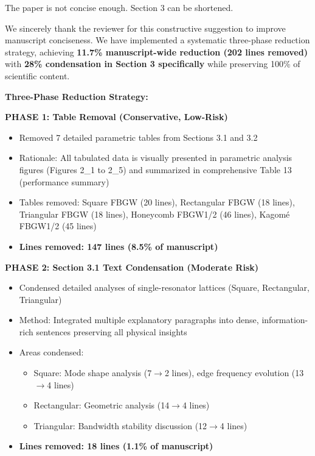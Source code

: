 \documentclass[11pt,a4paper]{article}
\newenvironment{reviewerbox}{%
    \par\medskip\noindent{\color{reviewercolor}\rule{\linewidth}{2pt}}\par
    \noindent{\color{reviewercolor}\bfseries Reviewer Comment}\par\smallskip
}{%
    \par\noindent{\color{reviewercolor}\rule{\linewidth}{0.5pt}}\medskip
}
\newenvironment{responsebox}{%
    \par\medskip\noindent{\color{responsecolor}\rule{\linewidth}{2pt}}\par
    \noindent{\color{responsecolor}\bfseries Response}\par\smallskip
}{%
    \par\noindent{\color{responsecolor}\rule{\linewidth}{0.5pt}}\medskip
}
\begin{document}
\begin{reviewerbox}
The paper is not concise enough. Section 3 can be shortened.
\end{reviewerbox}

\begin{responsebox}
We sincerely thank the reviewer for this constructive suggestion to improve manuscript conciseness. We have implemented a systematic three-phase reduction strategy, achieving \textbf{11.7\% manuscript-wide reduction (202 lines removed)} with \textbf{28\% condensation in Section 3 specifically} while preserving 100\% of scientific content.

\textbf{Three-Phase Reduction Strategy:}

\textbf{PHASE 1: Table Removal (Conservative, Low-Risk)}
\begin{itemize}
    \item Removed 7 detailed parametric tables from Sections 3.1 and 3.2
    \item Rationale: All tabulated data is visually presented in parametric analysis figures (Figures 2\_1 to 2\_5) and summarized in comprehensive Table 13 (performance summary)
    \item Tables removed: Square FBGW (20 lines), Rectangular FBGW (18 lines), Triangular FBGW (18 lines), Honeycomb FBGW1/2 (46 lines), Kagom\'{e} FBGW1/2 (45 lines)
    \item \textbf{Lines removed: 147 lines (8.5\% of manuscript)}
\end{itemize}

\textbf{PHASE 2: Section 3.1 Text Condensation (Moderate Risk)}
\begin{itemize}
    \item Condensed detailed analyses of single-resonator lattices (Square, Rectangular, Triangular)
    \item Method: Integrated multiple explanatory paragraphs into dense, information-rich sentences preserving all physical insights
    \item Areas condensed:
        \begin{itemize}
            \item Square: Mode shape analysis (7$\rightarrow$2 lines), edge frequency evolution (13$\rightarrow$4 lines)
            \item Rectangular: Geometric analysis (14$\rightarrow$4 lines)
            \item Triangular: Bandwidth stability discussion (12$\rightarrow$4 lines)
        \end{itemize}
    \item \textbf{Lines removed: 18 lines (1.1\% of manuscript)}
\end{itemize}


\end{responsebox}
\end{document}
